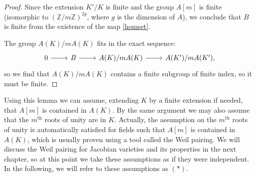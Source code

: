 \documentclass[a4paper, 12pt]{amsart}
\theoremstyle{definition}
\theoremstyle{plain}
\theoremstyle{plain}
\theoremstyle{plain}
\theoremstyle{plain}
\theoremstyle{remark}
\theoremstyle{remark}
\theoremstyle{plain}
\newcommand{\Zmod}[1]{\mathbb{Z}/#1\mathbb{Z}}
\begin{document}
\begin{proof}
	Since the extension $K'/K$ is finite and the group $A[m]$ is finite (isomorphic to $(\Zmod{m})^{2g}$, where $g$ is the dimension of $A$), we conclude that $B$ is finite from the existence of the map \eqref{homset}.
	
	The group $A(K)/mA(K)$ fits in the exact sequence:
	\begin{equation*}
		\begin{tikzcd}
			0\arrow{r}
			& B\arrow{r}
			& A(K)/mA(K)\arrow{r}
			& A(K')/mA(K'),
		\end{tikzcd}
	\end{equation*}
	so we find that $A(K)/mA(K)$ contains a finite subgroup of finite index, so it must be finite.
	\end{proof}
	Using this lemma we can assume, extending $K$ by a finite extension if needed, that $A[m]$ is contained in $A(K)$. By the same argument we may also assume that the $m^\text{th}$ roots of unity are in $K$. Actually, the assumption on the $m^\text{th}$ roots of unity is automatically satisfied for fields such that $A[m]$ is contained in $A(K)$, which is usually proven using a tool called the Weil pairing. We will discuss the Weil pairing for Jacobian varieties and its properties in the next chapter, so at this point we take these assumptions as if they were independent. In the following, we will refer to these assumptions as $(*)$.
	
\end{document}
